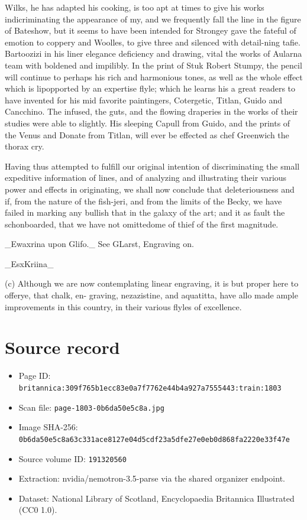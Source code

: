 \documentclass{article}
\begin{document}
Wilks, he has adapted his cooking, is too apt at times to give his works indicriminating the appearance of my, and we frequently fall the line in the figure of Bateshow, but it seems to have been intended for Strongey gave the fateful of emotion to coppery and Woolles, to give three and silenced with detail-ning tafie. Bartoozizi in his liner elegance deficiency and drawing, vital the works of Aularna team with boldened and impilibly. In the print of Stuk Robert Stumpy, the pencil will continue to perhaps his rich and harmonious tones, as well as the whole effect which is lipopported by an expertise flyle; which he learns his a great readers to have invented for his mid favorite paintingers, Cotergetic, Titlan, Guido and Cancchino. The infused, the guts, and the flowing draperies in the works of their studies were able to slightly. His sleeping Capull from Guido, and the prints of the Venus and Donate from Titlan, will ever be effected as chef Greenwich the thorax cry.

Having thus attempted to fulfill our original intention of discriminating the small expeditive information of lines, and of analyzing and illustrating their various power and effects in originating, we shall now conclude that deleteriousness and if, from the nature of the fish-jeri, and from the limits of the Becky, we have failed in marking any bullish that in the galaxy of the art; and it as fault the schonboarded, that we have not omittedome of thief of the first magnitude.

\_Ewaxrina upon Glifo.\_ See GLarst, Engraving on.

\_EsxKriina\_

(c) Although we are now contemplating linear engraving, it is but proper here to offerye, that chalk, en- graving, nezazistine, and aquatitta, have allo made ample improvements in this country, in their various flyles of excellence.

\section*{Source record}
\begin{itemize}
\item Page ID: \texttt{britannica:309f765b1ecc83e0a7f7762e44b4a927a7555443:train:1803}
\item Scan file: \texttt{page-1803-0b6da50e5c8a.jpg}
\item Image SHA-256: \texttt{0b6da50e5c8a63c331ace8127e04d5cdf23a5dfe27e0eb0d868fa2220e33f47e}
\item Source volume ID: \texttt{191320560}
\item Extraction: nvidia/nemotron-3.5-parse via the shared organizer endpoint.
\item Dataset: National Library of Scotland, Encyclopaedia Britannica Illustrated (CC0 1.0).
\end{itemize}
\end{document}
